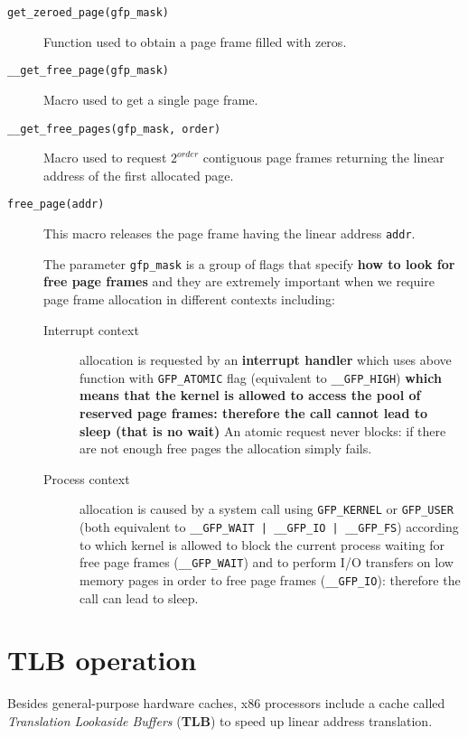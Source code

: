 \documentclass[10pt,a4paper]{article}
\begin{document}
\begin{description}
\item[\texttt{get\_zeroed\_page(gfp\_mask)}] Function used to obtain a page frame filled with zeros.
\item[\texttt{\_\_get\_free\_page(gfp\_mask)}] Macro used to get a single page frame.
\item[\texttt{\_\_get\_free\_pages(gfp\_mask, order)}] Macro used to request $2^{order}$ contiguous page frames returning the linear address of the
first allocated page.
\item[\texttt{free\_page(addr)}] This macro releases the page frame having the linear address \texttt{addr}.

The parameter \texttt{gfp\_mask} is a group of flags that specify \textbf{how to look for free page frames} and they are extremely important when we require page frame allocation in different contexts including: 
\begin{description}
\item[Interrupt context] allocation is requested by an \textbf{interrupt handler} which uses above function with \texttt{GFP\_ATOMIC} flag (equivalent to \texttt{\_\_GFP\_HIGH}) \textbf{which means that the kernel is allowed to access the pool of reserved page frames: therefore the call cannot lead to sleep (that is no wait)}  An atomic request never blocks: if there are not enough free pages the allocation simply fails.

\item[Process context] allocation is caused by a system call using \texttt{GFP\_KERNEL} or \texttt{GFP\_USER} (both equivalent to \texttt{\_\_GFP\_WAIT | \_\_GFP\_IO | \_\_GFP\_FS}) according to which kernel is allowed to block the current process waiting for free page frames (\texttt{\_\_GFP\_WAIT}) and to perform I/O transfers on low memory pages in order to free page frames (\texttt{\_\_GFP\_IO}): therefore the call can lead to sleep.
\end{description}

\end{description}



\section{TLB operation}

Besides general-purpose hardware caches, x86 processors include a cache called \textit{Translation Lookaside Buffers} (\textbf{TLB}) to speed up linear address translation.
\end{document}
